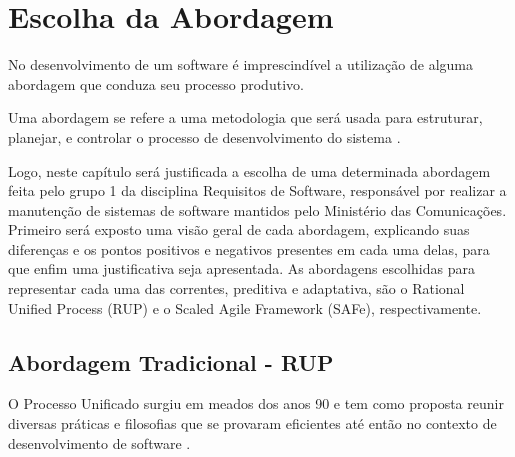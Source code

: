 \chapter[Escolha da Abordagem]{Escolha da Abordagem}
No desenvolvimento de um software é imprescindível a utilização de alguma abordagem que conduza seu processo produtivo.

Uma abordagem se refere a uma metodologia que será usada para estruturar, planejar, e controlar o processo de desenvolvimento do sistema \cite{CMS001}.

Logo, neste capítulo será justificada a escolha de uma determinada abordagem feita pelo grupo 1 da disciplina Requisitos de Software, responsável por realizar a manutenção de sistemas de software mantidos pelo Ministério das Comunicações. Primeiro será exposto uma visão geral de cada abordagem, explicando suas diferenças e os pontos positivos e negativos presentes em cada uma delas, para que enfim uma justificativa seja apresentada. As abordagens escolhidas para representar cada uma das correntes, preditiva e adaptativa, são o Rational Unified Process (RUP) e o Scaled Agile Framework (SAFe), respectivamente.

\section{Abordagem Tradicional - RUP}
O Processo Unificado surgiu em meados dos anos 90 e tem como proposta reunir diversas práticas e filosofias que se provaram eficientes até então no contexto de desenvolvimento de software \cite{kruchten001}.

